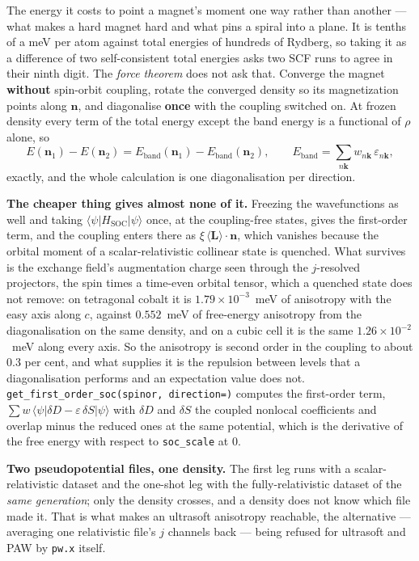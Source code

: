 \documentclass[11pt,a4paper]{article}
\newcommand{\code}[1]{\texttt{\small #1}}
\begin{document}
The energy it costs to point a magnet's moment one way rather than another ---
what makes a hard magnet hard and what pins a spiral into a plane. It is tenths
of a meV per atom against total energies of hundreds of Rydberg, so taking it as
a difference of two self-consistent total energies asks two SCF runs to agree in
their ninth digit. The \emph{force theorem} does not ask that. Converge the
magnet \textbf{without} spin-orbit coupling, rotate the converged density so its
magnetization points along $\mathbf n$, and diagonalise \textbf{once} with the
coupling switched on. At frozen density every term of the total energy except
the band energy is a functional of $\rho$ alone, so
\begin{equation*}
  E(\mathbf n_1) - E(\mathbf n_2)
    = E_{\text{band}}(\mathbf n_1) - E_{\text{band}}(\mathbf n_2),
  \qquad
  E_{\text{band}} = \sum_{n\mathbf k} w_{n\mathbf k}\, \varepsilon_{n\mathbf k},
\end{equation*}
exactly, and the whole calculation is one diagonalisation per direction.

\textbf{The cheaper thing gives almost none of it.} Freezing the wavefunctions
as well and taking $\langle\psi|H_{\text{SOC}}|\psi\rangle$ once, at the
coupling-free states, gives the first-order term, and the coupling enters there
as $\xi\,\langle \mathbf L\rangle\cdot\mathbf n$, which vanishes because the
orbital moment of a scalar-relativistic collinear state is quenched. What
survives is the exchange field's augmentation charge seen through the
$j$-resolved projectors, the spin times a time-even orbital tensor, which a
quenched state does not remove: on tetragonal cobalt it is $1.79\times10^{-3}$~meV
of anisotropy with the easy axis along $c$, against $0.552$~meV of free-energy
anisotropy from the diagonalisation on the same density, and on a cubic cell it
is the same $1.26\times10^{-2}$~meV along every axis. So the anisotropy is
second order in the coupling to about $0.3$ per cent, and what supplies it is
the repulsion between levels that a diagonalisation performs and an expectation
value does not. \code{get\_first\_order\_soc(spinor, direction=)} computes the
first-order term, $\sum w\,\langle\psi|\delta D - \varepsilon\,\delta
S|\psi\rangle$ with $\delta D$ and $\delta S$ the coupled nonlocal coefficients
and overlap minus the reduced ones at the same potential, which is the
derivative of the free energy with respect to \code{soc\_scale} at $0$.

\textbf{Two pseudopotential files, one density.} The first leg runs with a
scalar-relativistic dataset and the one-shot leg with the fully-relativistic
dataset of the \emph{same generation}; only the density crosses, and a density
does not know which file made it. That is what makes an ultrasoft anisotropy
reachable, the alternative --- averaging one relativistic file's $j$ channels
back --- being refused for ultrasoft and PAW by \code{pw.x} itself.
\end{document}
